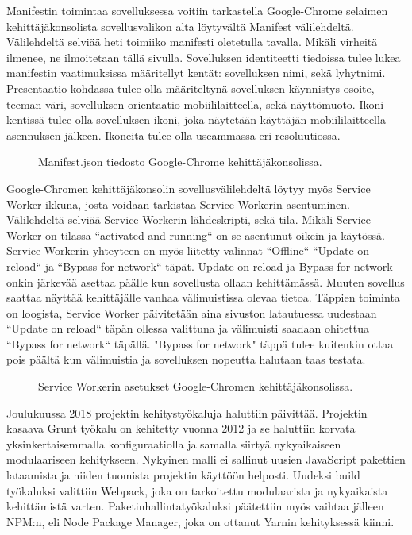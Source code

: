 \documentclass{tktltiki}
\begin{document}
Manifestin toimintaa sovelluksessa voitiin tarkastella Google-Chrome selaimen kehittäjäkonsolista sovellusvalikon alta löytyvältä Manifest välilehdeltä. Välilehdeltä selviää heti toimiiko manifesti oletetulla tavalla. Mikäli virheitä ilmenee, ne ilmoitetaan tällä sivulla. Sovelluksen identiteetti tiedoissa tulee lukea manifestin vaatimuksissa määritellyt kentät: sovelluksen nimi, sekä lyhytnimi. Presentaatio kohdassa tulee olla määriteltynä sovelluksen käynnistys osoite, teeman väri, sovelluksen orientaatio mobiililaitteella, sekä näyttömuoto. Ikoni kentissä tulee olla sovelluksen ikoni, joka näytetään käyttäjän mobiililaitteella asennuksen jälkeen. Ikoneita tulee olla useammassa eri resoluutiossa. 

\begin{figure}[h]
\begin{center}
\caption{Manifest.json tiedosto Google-Chrome kehittäjäkonsolissa.}
\label{Manifest.json}
\end{center}
\end{figure}
\clearpage

Google-Chromen kehittäjäkonsolin sovellusvälilehdeltä löytyy myös Service Worker ikkuna, josta voidaan tarkistaa Service Workerin asentuminen. Välilehdeltä selviää Service Workerin lähdeskripti, sekä tila. Mikäli Service Worker on tilassa “activated and running“ on se asentunut oikein ja käytössä. Service Workerin yhteyteen on myös liitetty valinnat “Offline“ “Update on reload“ ja “Bypass for network“ täpät. Update on reload ja Bypass for network onkin järkevää asettaa päälle kun sovellusta ollaan kehittämässä. Muuten sovellus saattaa näyttää kehittäjälle vanhaa välimuistissa olevaa tietoa. Täppien toiminta on loogista, Service Worker päivitetään aina sivuston latautuessa uudestaan “Update on reload“ täpän ollessa valittuna ja välimuisti saadaan ohitettua “Bypass for network“ täpällä. "Bypass for network" täppä tulee kuitenkin ottaa pois päältä kun välimuistia ja sovelluksen nopeutta halutaan taas testata.

\begin{figure}[h]
\begin{center}
\caption{Service Workerin asetukset Google-Chromen kehittäjäkonsolissa.}
\label{Service Worker}
\end{center}
\end{figure}

Joulukuussa 2018 projektin kehitystyökaluja haluttiin päivittää. Projektin kasaava Grunt työkalu on kehitetty vuonna 2012 ja se haluttiin korvata yksinkertaisemmalla konfiguraatiolla ja samalla siirtyä nykyaikaiseen modulaariseen kehitykseen. Nykyinen malli ei sallinut uusien JavaScript pakettien lataamista ja niiden tuomista projektin käyttöön helposti. Uudeksi build työkaluksi valittiin Webpack, joka on tarkoitettu modulaarista ja nykyaikaista kehittämistä varten. Paketinhallintatyökaluksi päätettiin myös vaihtaa jälleen NPM:n, eli Node Package Manager, joka on ottanut Yarnin kehityksessä kiinni. 
\end{document}
